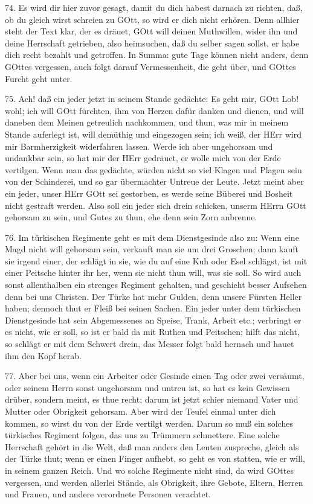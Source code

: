 74. Es wird dir hier zuvor gesagt, damit du dich habest darnach zu richten, daß, ob du gleich wirst schreien zu GOtt, so wird er dich nicht erhören. Denn allhier steht der Text klar, der es dräuet, GOtt will deinen Muthwillen, wider ihn und deine Herrschaft getrieben, also heimsuchen, daß du selber sagen sollst, er habe dich recht bezahlt und getroffen. In Summa: gute Tage können nicht anders, denn GOttes vergessen, auch folgt darauf Vermessenheit, die geht über, und GOttes Furcht geht unter.

75. Ach! daß ein jeder jetzt in seinem Stande gedächte: Es geht mir, GOtt Lob! wohl; ich will GOtt fürchten, ihm von Herzen dafür danken und dienen, und will daneben dem Meinen getreulich nachkommen, und thun, was mir in meinem Stande auferlegt ist, will demüthig und eingezogen sein; ich weiß, der HErr wird mir Barmherzigkeit widerfahren lassen. Werde ich aber ungehorsam und undankbar sein, so hat mir der HErr gedräuet, er wolle mich von der Erde vertilgen. Wenn man das gedächte, würden nicht so viel Klagen und Plagen sein von der Schinderei, und so gar übermachter Untreue der Leute. Jetzt meint aber ein jeder, unser HErr GOtt sei gestorben, es werde seine Büberei und Bosheit nicht gestraft werden. Also soll ein jeder sich drein schicken, unserm HErrn GOtt gehorsam zu sein, und Gutes zu thun, ehe denn sein Zorn anbrenne.

76. Im türkischen Regimente geht es mit dem Dienstgesinde also zu: Wenn eine Magd nicht will gehorsam sein, verkauft man sie um drei Groschen; dann kauft sie irgend einer, der schlägt in sie, wie du auf eine Kuh oder Esel schlägst, ist mit einer Peitsche hinter ihr her, wenn sie nicht thun will, was sie soll. So wird auch sonst allenthalben ein strenges Regiment gehalten, und geschieht besser Aufsehen denn bei uns Christen. Der Türke hat mehr Gulden, denn unsere Fürsten Heller haben; dennoch thut er Fleiß bei seinen Sachen. Ein jeder unter dem türkischen Dienstgesinde hat sein Abgemessenes an Speise, Trank, Arbeit etc.; verbringt er es nicht, wie er soll, so ist er bald da mit Ruthen und Peitschen; hilft das nicht, so schlägt er mit dem Schwert drein, das Messer folgt bald hernach und hauet ihm den Kopf herab.

77. Aber bei uns, wenn ein Arbeiter oder Gesinde einen Tag oder zwei versäumt, oder seinem Herrn sonst ungehorsam und untreu ist, so hat es kein Gewissen drüber, sondern meint, es thue recht; darum ist jetzt schier niemand Vater und Mutter oder Obrigkeit gehorsam. Aber wird der Teufel einmal unter dich kommen, so wirst du von der Erde vertilgt werden. Darum so muß ein solches türkisches Regiment folgen, das uns zu Trümmern schmettere. Eine solche Herrschaft gehört in die Welt, daß man anders den Leuten zuspreche, gleich als der Türke thut; wenn er einen Finger aufhebt, so geht es von statten, wie er will, in seinem ganzen Reich. Und wo solche Regimente nicht sind, da wird GOttes vergessen, und werden allerlei Stände, als Obrigkeit, ihre Gebote, Eltern, Herren und Frauen, und andere verordnete Personen verachtet.

